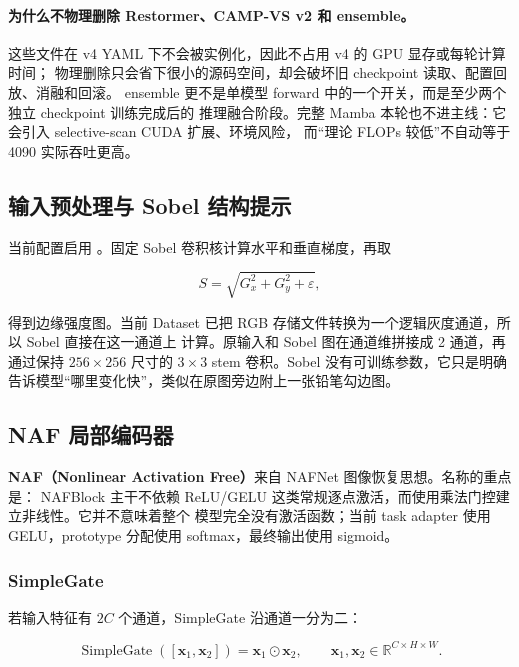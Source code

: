 \documentclass[12pt,a4paper,UTF8]{ctexart}
\newcommand{\code}[1]{\texttt{\detokenize{#1}}}
\newcommand{\term}[2]{\textbf{#1（#2）}}
\begin{document}
\paragraph{为什么不物理删除 Restormer、CAMP-VS v2 和 ensemble。}
这些文件在 v4 YAML 下不会被实例化，因此不占用 v4 的 GPU 显存或每轮计算时间；
物理删除只会省下很小的源码空间，却会破坏旧 checkpoint 读取、配置回放、消融和回滚。
ensemble 更不是单模型 forward 中的一个开关，而是至少两个独立 checkpoint 训练完成后的
推理融合阶段。完整 Mamba 本轮也不进主线：它会引入 selective-scan CUDA 扩展、环境风险，
而“理论 FLOPs 较低”不自动等于 4090 实际吞吐更高。

\subsection{输入预处理与 Sobel 结构提示}

当前配置启用 \code{use_sobel_input=true}。固定 Sobel 卷积核计算水平和垂直梯度，再取

\begin{equation}
  S=\sqrt{G_x^2+G_y^2+\varepsilon},
\end{equation}

得到边缘强度图。当前 Dataset 已把 RGB 存储文件转换为一个逻辑灰度通道，所以 Sobel 直接在这一通道上
计算。原输入和 Sobel 图在通道维拼接成 2 通道，再通过保持 $256\times256$ 尺寸的 $3\times3$ stem 卷积。Sobel
没有可训练参数，它只是明确告诉模型“哪里变化快”，类似在原图旁边附上一张铅笔勾边图。

\subsection{NAF 局部编码器}

\term{NAF}{Nonlinear Activation Free}来自 NAFNet 图像恢复思想\cite{nafnet}。名称的重点是：
NAFBlock 主干不依赖 ReLU/GELU 这类常规逐点激活，而使用乘法门控建立非线性。它并不意味着整个
模型完全没有激活函数；当前 task adapter 使用 GELU，prototype 分配使用 softmax，最终输出使用 sigmoid。

\subsubsection{SimpleGate}

若输入特征有 $2C$ 个通道，SimpleGate 沿通道一分为二：

\begin{equation}
  \operatorname{SimpleGate}([\mathbf{x}_1,\mathbf{x}_2])
  =\mathbf{x}_1\odot\mathbf{x}_2,
  \qquad \mathbf{x}_1,\mathbf{x}_2\in\mathbb{R}^{C\times H\times W}.
\end{equation}
\end{document}
